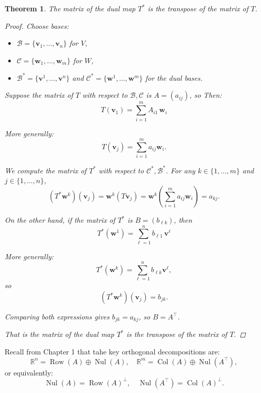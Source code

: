 \documentclass[11pt]{article}
\newtheorem{theorem}{Theorem}
\begin{document}
\begin{theorem}
The matrix of the dual map $ T^* $ is the transpose of the matrix of $ T $.
\begin{proof}
Choose bases:

\begin{itemize}
\item $ \mathcal{B} = \{ \mathbf{v}_1, \dots, \mathbf{v}_n \} $ for $ V $,
    \item $ \mathcal{C} = \{ \mathbf{w}_1, \dots, \mathbf{w}_m \} $ for $ W $,
    \item $ \mathcal{B}^* = \{ \mathbf{v}^1, \dots, \mathbf{v}^n \} $ and $ \mathcal{C}^* = \{ \mathbf{w}^1, \dots, \mathbf{w}^m \} $ for the dual bases.
\end{itemize}


Suppose the matrix of $ T $ with respect to $ \mathcal{B}, \mathcal{C} $ is $ A = (a_{ij})$, so
Then:
\[
T(\mathbf{v}_1) = \sum_{i=1}^{m} A_{i1} \, \mathbf{w}_i
\]

More generally:
\[
T(\mathbf{v}_j) = \sum_{i=1}^m a_{ij} \mathbf{w}_i.
\]

We compute the matrix of $ T^* $ with respect to $ \mathcal{C}^*, \mathcal{B}^* $.  
For any $ k \in \{1, \dots, m\} $ and $ j \in \{1, \dots, n\} $,
\[
(T^* \mathbf{w}^k)(\mathbf{v}_j) = \mathbf{w}^k(T \mathbf{v}_j) = \mathbf{w}^k\left( \sum_{i=1}^m a_{ij} \mathbf{w}_i \right) = a_{kj}.
\]

On the other hand, if the matrix of $ T^* $ is $ B = (b_{\ell k}) $, then
\[
T^*(\mathbf{w}^1) = \sum_{\ell=1}^{n} b_{\ell 1} \, \mathbf{v}^\ell
\]


More generally:
\[
T^*(\mathbf{w}^k) = \sum_{\ell=1}^n b_{\ell k} \mathbf{v}^\ell,
\]
so
\[
(T^* \mathbf{w}^k)(\mathbf{v}_j) = b_{j k}.
\]

Comparing both expressions gives $ b_{j k} = a_{k j} $, so $ B = A^\top $.


That is the matrix of the dual map $ T^* $ is the transpose of the matrix of $ T $.
\end{proof}
\end{theorem}










Recall from Chapter 1 that
tahe key orthogonal decompositions are:
\[
\mathbb{R}^n = \operatorname{Row}(A) \oplus \operatorname{Nul}(A), \quad
\mathbb{R}^m = \operatorname{Col}(A) \oplus \operatorname{Nul}(A^\top),
\]
or equivalently:
\[
\operatorname{Nul}(A) = \operatorname{Row}(A)^\perp, \quad
\operatorname{Nul}(A^\top) = \operatorname{Col}(A)^\perp.
\]
\end{document}
